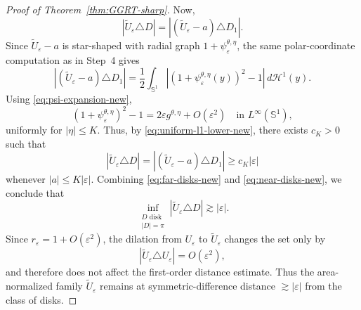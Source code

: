 \begin{proof}[Proof of Theorem~\ref{thm:GGRT-sharp}]
Now,
\[
|\widetilde U_\varepsilon \triangle D|
=
|(\widetilde U_\varepsilon-a)\triangle D_1|.
\]
Since $\widetilde U_\varepsilon-a$ is star-shaped with radial graph
$1+\psi_\varepsilon^{\theta,\eta}$, the same polar-coordinate computation as in
Step~4 gives
\[
|(\widetilde U_\varepsilon-a)\triangle D_1|
=
\frac12\int_{\mathbb S^1}
\left|(1+\psi_\varepsilon^{\theta,\eta}(y))^2-1\right|
\,d\mathcal H^1(y).
\]
Using \eqref{eq:psi-expansion-new},
\[
(1+\psi_\varepsilon^{\theta,\eta})^2-1
=
2\varepsilon g^{\theta,\eta}+O(\varepsilon^2)
\quad \text{in } L^\infty(\mathbb S^1),
\]
uniformly for $|\eta|\leq K$. Thus, by \eqref{eq:uniform-l1-lower-new},
there exists $c_K>0$ such that
\begin{equation}\label{eq:near-disks-new}
|\widetilde U_\varepsilon \triangle D|
=
|(\widetilde U_\varepsilon-a)\triangle D_1|
\geq
c_K |\varepsilon|
\end{equation}
whenever $|a|\leq K|\varepsilon|$. Combining \eqref{eq:far-disks-new} and \eqref{eq:near-disks-new}, we conclude
that
\[
\inf_{\substack{D \text{ disk}\\ |D|=\pi}}
|\widetilde U_\varepsilon \triangle D|
\gtrsim |\varepsilon|.
\]
Since \(r_\varepsilon=1+O(\varepsilon^2)\), the dilation from \(U_\varepsilon\)
to \(\widetilde U_\varepsilon\) changes the set only by
\[
|\widetilde U_\varepsilon\triangle U_\varepsilon|=O(\varepsilon^2),
\]
and therefore does not affect the first-order distance estimate. Thus the
area-normalized family \(\widetilde U_\varepsilon\) remains at
symmetric-difference distance \(\gtrsim |\varepsilon|\) from the class of
disks.


\end{proof}
